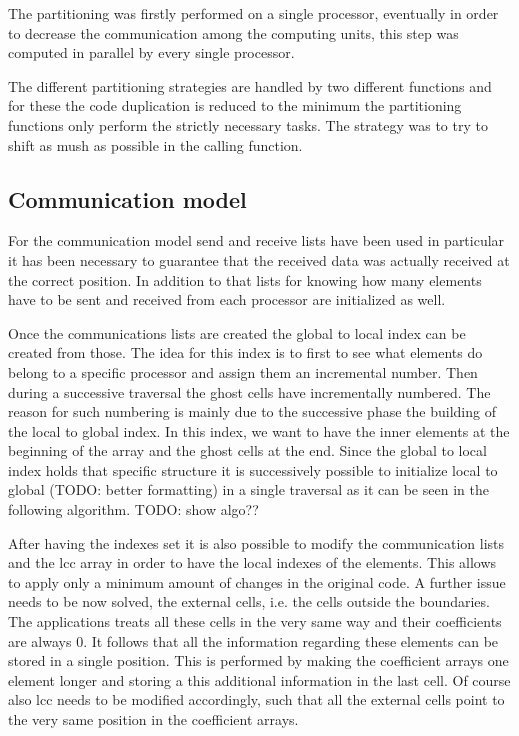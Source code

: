 \documentclass[12pt, a4paper]{article}
\begin{document}
  The partitioning was firstly performed on a single processor, eventually in
  order to decrease the communication among the computing units, this step was
  computed in parallel by every single processor.

  The different partitioning strategies are handled by two different functions
  and for these the code duplication is reduced to the minimum the partitioning
  functions only perform the strictly necessary tasks. The strategy was to try
  to shift as mush as possible in the calling function.

  \subsection*{Communication model}
  For the communication model send and receive lists have been used in
  particular it has been necessary to guarantee that the received data was
  actually received at the correct position. In addition to that lists for
  knowing how many elements have to be sent and received from each processor are
  initialized as well.

  Once the communications lists are created the global to local index can be
  created from those. The idea for this index is to first to see what elements
  do belong to a specific processor and assign them an incremental number. Then
  during a successive traversal the ghost cells have incrementally numbered.
  The reason for such numbering is mainly due to the successive phase the
  building of the local to global index. In this index, we want to have the
  inner elements at the beginning of the array and the ghost cells at the end.
  Since the global to local index holds that specific structure it is
  successively possible to initialize local to global (TODO: better formatting)
  in a single traversal as it can be seen in the following algorithm.
  TODO: show algo??

  After having the indexes set it is also possible to modify the communication 
  lists and the lcc array in order to have the local indexes of the elements. 
  This allows to apply only a minimum amount of changes in the original code.
  A further issue needs to be now solved, the external cells, i.e. the cells
  outside the boundaries. The applications treats all these cells in the very
  same way and their coefficients are always $0$. It follows that all the
  information regarding these elements can be stored in a single position. This
  is performed by making the coefficient arrays one element longer and storing a
  this additional information in the last cell. Of course also lcc needs to be
  modified accordingly, such that all the external cells point to the very same
  position in the coefficient arrays.
\end{document}
